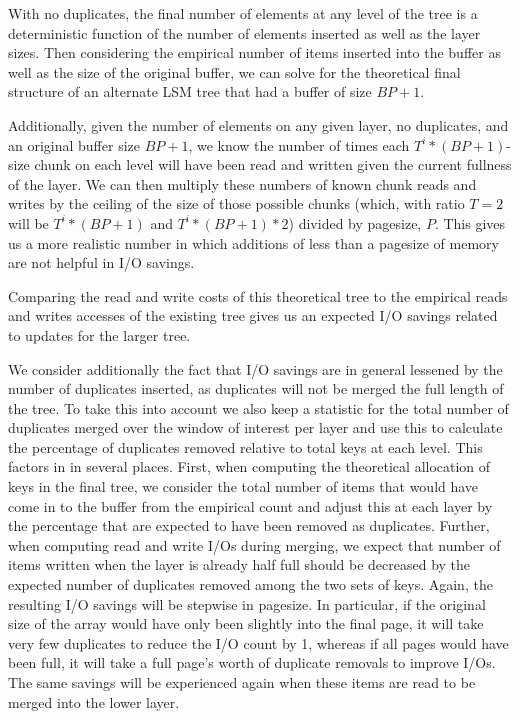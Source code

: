 \documentclass{cidr-2019}
\begin{document}
With no duplicates, the final number of elements at any level of the tree is a deterministic function of the number of elements
inserted as well as the layer sizes. Then considering the empirical number of items inserted into the buffer as well as the 
size of the original buffer, we can solve for the theoretical final structure of an alternate LSM tree that had a buffer of size 
$BP + 1$.

Additionally, given the number of elements on any given layer, no duplicates, and an original buffer size $BP+1$, we know the number of times each $T^{i}*(BP+1)$-size chunk on each level will have been read and written given the current fullness of the layer. We can then multiply these numbers of known chunk reads and writes by the ceiling of the size of those possible chunks (which, with ratio $T=2$ will be $T^{i}*(BP+1)$ and $T^{i}*(BP+1)*2$) divided by pagesize, $P$. This gives us a more realistic number in which additions of less than a pagesize of memory are not helpful in I/O savings. 

Comparing the read and write costs of this theoretical tree to the empirical reads and writes accesses of the existing
tree gives us an expected I/O savings related to updates for the larger tree.

We consider additionally the fact that I/O savings are in general lessened by the number
of duplicates inserted, as duplicates will not be merged the full length of the
tree. To take this into account we also keep a statistic for the total number
of duplicates merged over the window of interest per layer and use this to calculate the percentage of duplicates removed
relative to total keys at each level. This factors in in several places. First, when computing the theoretical allocation
of keys in the final tree, we consider the total number of items that would have come in to the buffer from the empirical
count and adjust this at each layer by the percentage that are expected to have been removed as duplicates.
Further, when computing read and write I/Os during merging, we expect that number of items written when the layer is already half full should be decreased by the expected number of duplicates removed among the two sets of keys. Again, the resulting I/O savings will be stepwise in pagesize. In particular, if the original size of the array would have only been slightly into the final page, it will take very few duplicates to reduce the I/O count by 1, whereas if all pages would have been full, it will take a full page's worth of duplicate removals to improve I/Os. The same savings will be experienced again when these items are read to be merged into the lower layer.
\end{document}
